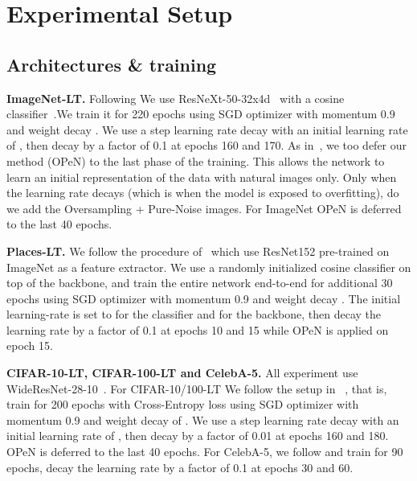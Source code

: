 \documentclass[nohyperref]{article}
\theoremstyle{plain}
\theoremstyle{definition}
\theoremstyle{remark}
\begin{document}
\vspace*{-0.35cm}
\section{Experimental Setup}\label{sec:Experimental_Setup}
\vspace*{-0.1cm}
\subsection{Architectures \& training}
\textbf{ImageNet-LT.} Following \cite{hong2021disentangling} We use ResNeXt-50-32x4d~\cite{xie2017aggregated} with a cosine classifier~\cite{gidaris2018dynamic}.We train it for 220 epochs using SGD optimizer with momentum 0.9 and weight decay . We use a step learning rate decay with an initial learning rate of , then decay by a factor of 0.1 at epochs 160 and 170. As in~\cite{cao2019learning,kim2020m2m}, we too defer our method (OPeN) to the last phase of the training. This allows the network to learn an initial representation of the data with natural images only. Only when the learning rate decays (which is when the model is exposed to overfitting), do we add the Oversampling + Pure-Noise images. For ImageNet OPeN is deferred to the last 40 epochs.

\textbf{Places-LT.} We follow the procedure of~\cite{hong2021disentangling,ren2020balanced,kang2019decoupling} which use ResNet152 pre-trained on ImageNet as a feature extractor. We use a randomly initialized cosine classifier on top of the backbone, and train the entire network end-to-end for additional 30 epochs using SGD optimizer with momentum 0.9 and weight decay . The initial learning-rate is set to  for the classifier and  for the backbone, then decay the learning rate by a factor of 0.1 at epochs 10 and 15 while OPeN is applied on epoch 15.

\textbf{CIFAR-10-LT, CIFAR-100-LT and CelebA-5.} All experiment use  WideResNet-28-10~\cite{zagoruyko2016wide}. For CIFAR-10/100-LT We follow the setup in ~\cite{kim2020m2m, cao2019learning}, that is, train for 200 epochs with Cross-Entropy loss using SGD optimizer with momentum 0.9 and weight decay of . We use a step learning rate decay with an initial learning rate of , then decay by a factor of 0.01 at epochs 160 and 180. OPeN is deferred to the last 40 epochs. For CelebA-5\cite{kim2020m2m}, we follow \cite{kim2020m2m} and train for 90 epochs, decay the learning rate by a factor of 0.1 at epochs 30 and 60. 
\end{document}
